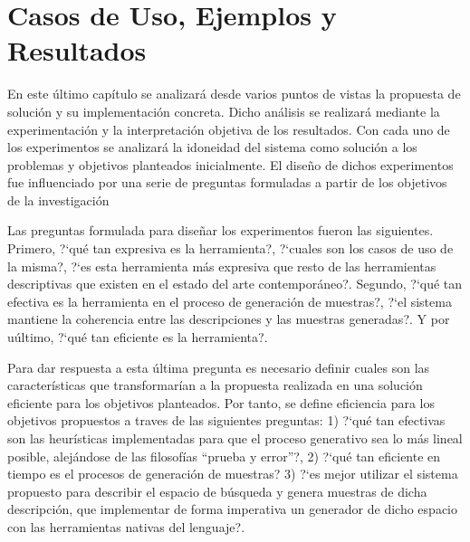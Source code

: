 \chapter{Casos de Uso, Ejemplos y Resultados}\label{chapter:implementation}

En este último capítulo se analizará desde varios puntos de vistas
la propuesta de solución y su implementación concreta. Dicho análisis 
se realizará mediante la experimentación y la interpretación objetiva de 
los resultados. Con cada uno de los experimentos se analizará la idoneidad
del sistema como solución a los problemas y objetivos planteados inicialmente. 
El diseño de dichos experimentos fue influenciado por una serie de preguntas 
formuladas a partir de los objetivos de la investigación

Las preguntas formulada para diseñar los experimentos fueron las siguientes. 
Primero, ?`qué tan expresiva es la herramienta?, ?`cuales son los
casos de uso de la misma?, ?`es esta herramienta más expresiva que resto de las 
herramientas descriptivas que existen en el estado del arte contemporáneo?. 
Segundo, ?`qué tan efectiva es la herramienta en el proceso de generación de muestras?, 
?`el sistema mantiene la coherencia entre las descripciones
y las muestras generadas?. Y por uúltimo, ?`qué tan eficiente es la herramienta?.

Para dar respuesta a esta última pregunta es necesario definir cuales son las características
que transformarían a la propuesta realizada en una solución eficiente para los objetivos
planteados. Por tanto, se define eficiencia para los objetivos propuestos a traves de las siguientes preguntas: 
1) ?`qué tan efectivas son las heurísticas implementadas para que el proceso generativo sea lo más lineal
posible, alejándose de las filosofías ``prueba y error''?, 2) ?`qué tan eficiente en tiempo es el
procesos de generación de muestras? 3) ?`es mejor utilizar el sistema propuesto para describir el
espacio de búsqueda y genera muestras de dicha descripción, que implementar de forma imperativa
un generador de dicho espacio con las herramientas nativas del lenguaje?.

